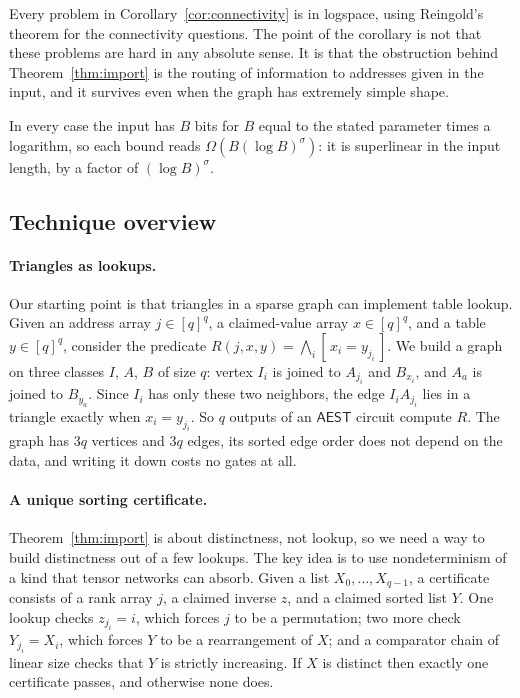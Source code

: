 \documentclass[11pt]{article}
\theoremstyle{definition}
\theoremstyle{remark}
\newcommand{\AEST}{\mathsf{AEST}}
\newcommand{\ind}[1]{[\,#1\,]}
\begin{document}
Every problem in Corollary~\ref{cor:connectivity} is in logspace, using
Reingold's theorem \cite{Rei} for the connectivity questions. The point of
the corollary is not that these problems are hard in any absolute sense.
It is that the obstruction behind Theorem~\ref{thm:import} is the routing
of information to addresses given in the input, and it survives even
when the graph has extremely simple shape.

In every case the input has $B$ bits for $B$ equal to the stated parameter
times a logarithm, so each bound reads $\Omega(B(\log B)^{\sigma})$: it is
superlinear in the input length, by a factor of $(\log B)^\sigma$.

\subsection{Technique overview}

\paragraph{Triangles as lookups.} Our starting point is that triangles in
a sparse graph can implement table lookup. Given an address array
$j\in[q]^q$, a claimed-value array $x\in[q]^q$, and a table $y\in[q]^q$,
consider the predicate $R(j,x,y)=\bigwedge_i\ind{x_i=y_{j_i}}$. We build a
graph on three classes $I$, $A$, $B$ of size $q$: vertex $I_i$ is joined to
$A_{j_i}$ and $B_{x_i}$, and $A_a$ is joined to $B_{y_a}$. Since $I_i$ has
only these two neighbors, the edge $I_iA_{j_i}$ lies in a triangle exactly
when $x_i=y_{j_i}$. So $q$ outputs of an $\AEST$ circuit compute $R$. The
graph has $3q$ vertices and $3q$ edges, its sorted edge order does not
depend on the data, and writing it down costs no gates at all.

\paragraph{A unique sorting certificate.} Theorem~\ref{thm:import} is
about distinctness, not lookup, so we need a way to build distinctness
out of a few lookups. The key idea is
to use nondeterminism of a kind that tensor networks can absorb. Given a
list $X_0,\dots,X_{q-1}$, a certificate consists of a rank array $j$, a
claimed inverse $z$, and a claimed sorted list $Y$. One lookup checks
$z_{j_i}=i$, which forces $j$ to be a permutation; two more check
$Y_{j_i}=X_i$, which forces $Y$ to be a rearrangement of $X$; and a
comparator chain of linear size checks that $Y$ is strictly increasing.
If $X$ is distinct then exactly one certificate passes, and otherwise none
does.
\end{document}
